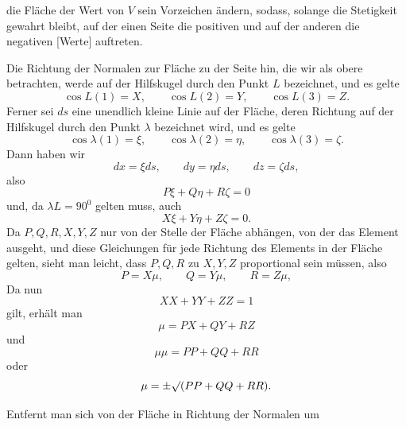 %
die Fläche der Wert von $V$ sein Vorzeichen ändern, sodass, solange die Stetigkeit gewahrt bleibt, auf der einen Seite die positiven und auf der anderen die negativen [Werte] auftreten.

Die Richtung der Normalen zur Fläche zu der Seite hin, die wir als obere betrachten, werde auf der Hilfskugel durch den Punkt $L$ bezeichnet, und es gelte
\[
\cos L(1)=X,\qquad\cos L(2)=Y,\qquad\cos L(3)=Z.
\]
Ferner sei $ds$ eine unendlich kleine Linie auf der Fläche, deren Richtung auf der Hilfskugel durch den Punkt $\lambda$ bezeichnet wird, und es gelte
\[
\cos\lambda(1)=\xi,\qquad\cos\lambda(2)=\eta,\qquad\cos\lambda(3)=\zeta.
\]
Dann haben wir
\[
dx=\xi ds,\qquad dy=\eta ds,\qquad dz=\zeta ds,
\]
also
\[
P\xi+Q\eta+R\zeta=0
\]
und, da $\lambda L=90^{0}$ gelten muss, auch
\[
X\xi+Y\eta+Z\zeta=0.
\]
Da $P,Q,R,X,Y,Z$ nur von der Stelle der Fläche abhängen, von der das Element ausgeht, und diese Gleichungen für jede Richtung des Elements in der Fläche gelten, sieht man leicht, dass $P,Q,R$ zu $X,Y,Z$ proportional sein müssen, also
\[
P=X\mu,\qquad Q=Y\mu,\qquad R=Z\mu,
\]
Da nun
\[
XX+YY+ZZ=1
\]
gilt, erhält man
\[
\mu=PX+QY+RZ
\]
und
\[
\mu\mu=PP+QQ+RR
\]
oder
\[
\mu=\pm\mathord{\surd}(PP+QQ+RR).
\]

Entfernt man sich von der Fläche in Richtung der Normalen um\space%
